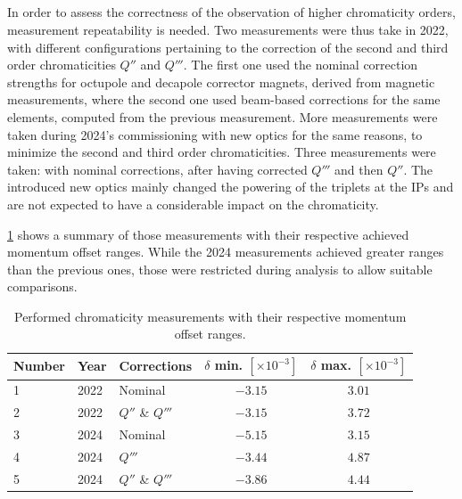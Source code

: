 \subsection{}

In order to assess the correctness of the observation of higher chromaticity orders, measurement
repeatability is needed. Two measurements were thus take in 2022, with different configurations
pertaining to the correction of the second and third order chromaticities $Q''$ and $Q'''$. 
The first one used the nominal correction strengths for octupole and decapole corrector magnets,
derived from magnetic measurements, where the second one used beam-based corrections for the same
elements, computed from the previous measurement.
More measurements were taken during 2024's commissioning with new optics for the same reasons, to
minimize the second and third order chromaticities. Three measurements were taken: with nominal
corrections, after having corrected $Q'''$  and then $Q''$. The introduced new optics mainly changed
the powering of the triplets at the IPs and are not expected to have a considerable impact on the
chromaticity. 

\cref{table:high_orders:dpp_ranges} shows a summary of those measurements with their respective 
achieved momentum offset ranges. While the 2024 measurements achieved greater ranges than the
previous ones, those were restricted during analysis to allow suitable comparisons.

\begin{table}[!htb]
  \centering
  \begin{tabular}{lllcc}
    \toprule
    Number & Year & Corrections      & $\delta$ min. $[\times 10^{-3}]$ & $\delta$ max. $[\times 10^{-3}]$  \\
    \midrule
    1 & 2022 & Nominal          & $-3.15$ & $3.01$  \\
    2 & 2022 & $Q''$ \& $Q'''$  & $-3.15$ & $3.72$  \\
    3 & 2024 & Nominal          & $-5.15$ & $3.15$  \\
    4 & 2024 & $Q'''$           & $-3.44$ & $4.87$  \\
    5 & 2024 & $Q''$ \& $Q'''$  & $-3.86$ & $4.44$  \\
    \bottomrule
  \end{tabular}
  \caption{Performed chromaticity measurements with their respective momentum offset ranges.}
  \label{table:high_orders:dpp_ranges}
\end{table}

